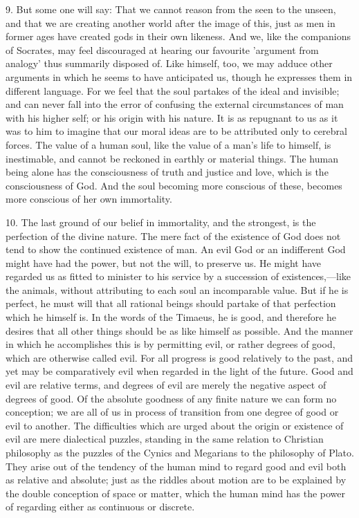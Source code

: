 9. But some one will say: That we cannot reason from the seen to the
unseen, and that we are creating another world after the image of this,
just as men in former ages have created gods in their own likeness. And
we, like the companions of Socrates, may feel discouraged at hearing our
favourite 'argument from analogy' thus summarily disposed of. Like
himself, too, we may adduce other arguments in which he seems to have
anticipated us, though he expresses them in different language. For we
feel that the soul partakes of the ideal and invisible; and can never fall
into the error of confusing the external circumstances of man with his
higher self; or his origin with his nature. It is as repugnant to us as it
was to him to imagine that our moral ideas are to be attributed only to
cerebral forces. The value of a human soul, like the value of a man's life
to himself, is inestimable, and cannot be reckoned in earthly or material
things. The human being alone has the consciousness of truth and justice
and love, which is the consciousness of God. And the soul becoming more
conscious of these, becomes more conscious of her own immortality.

10. The last ground of our belief in immortality, and the strongest, is
the perfection of the divine nature. The mere fact of the existence of God
does not tend to show the continued existence of man. An evil God or an
indifferent God might have had the power, but not the will, to preserve
us. He might have regarded us as fitted to minister to his service by a
succession of existences,—like the animals, without attributing to
each soul an incomparable value. But if he is perfect, he must will that
all rational beings should partake of that perfection which he himself is.
In the words of the Timaeus, he is good, and therefore he desires that all
other things should be as like himself as possible. And the manner in
which he accomplishes this is by permitting evil, or rather degrees of
good, which are otherwise called evil. For all progress is good relatively
to the past, and yet may be comparatively evil when regarded in the light
of the future. Good and evil are relative terms, and degrees of evil are
merely the negative aspect of degrees of good. Of the absolute goodness of
any finite nature we can form no conception; we are all of us in process
of transition from one degree of good or evil to another. The difficulties
which are urged about the origin or existence of evil are mere dialectical
puzzles, standing in the same relation to Christian philosophy as the
puzzles of the Cynics and Megarians to the philosophy of Plato. They arise
out of the tendency of the human mind to regard good and evil both as
relative and absolute; just as the riddles about motion are to be
explained by the double conception of space or matter, which the human
mind has the power of regarding either as continuous or discrete.


